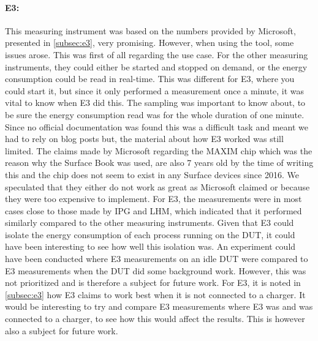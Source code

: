 \paragraph*{E3:} This measuring instrument was based on the numbers provided by Microsoft, presented in \cref{subsec:e3}, very promising. However, when using the tool, some issues arose. This was first of all regarding the use case. For the other measuring instruments, they could either be started and stopped on demand, or the energy consumption could be read in real-time. This was different for E3, where you could start it, but since it only performed a measurement once a minute, it was vital to know when E3 did this. The sampling was important to know about, to be sure the energy consumption read was for the whole duration of one minute. Since no official documentation was found this was a difficult task and meant we had to rely on blog posts but, the material about how E3 worked was still limited.
The claims made by Microsoft regarding the MAXIM chip which was the reason why the Surface Book was used, are also 7 years old by the time of writing this and the chip does not seem to exist in any Surface devices since 2016. We speculated that they either do not work as great as Microsoft claimed or because they were too expensive to implement. For E3, the measurements were in most cases close to those made by IPG and LHM, which indicated that it performed similarly compared to the other measuring instruments. Given that E3 could isolate the energy consumption of each process running on the DUT, it could have been interesting to see how well this isolation was. An experiment could have been conducted where E3 measurements on an idle DUT were compared to E3 measurements when the DUT did some background work. However, this was not prioritized and is therefore a subject for future work. For E3, it is noted in \cref{subsec:e3} how E3 claims to work best when it is not connected to a charger. It would be interesting to try and compare E3 measurements where E3 was and was connected to a charger, to see how this would affect the results. This is however also a subject for future work.


